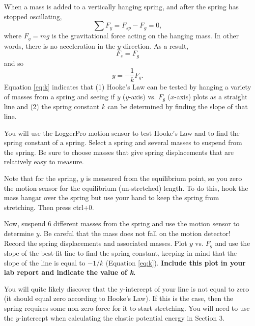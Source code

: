 \documentclass[11pt,letterpaper]{article}
\begin{document}
When a mass is added to a vertically hanging spring, and after the spring has stopped oscillating, 
\begin{equation}
\sum{F_y}=F_{sp}-F_g=0,
\label{eq:F_y}
\end{equation}
where $F_g=mg$ is the gravitational force acting on the hanging mass. In other words, there is no acceleration in the $y$-direction. As a result, 
\begin{equation}
F_s=F_g
\end{equation}
and so
\begin{equation}
y=-\frac{1}{k}F_g.
\label{eq:k}
\end{equation}
Equation \ref{eq:k} indicates that (1) Hooke's Law can be tested by hanging a variety of masses from a spring and seeing if $y$ ($y$-axis) vs. $F_g$ ($x$-axis) plots as a straight line and (2) the spring constant $k$ can be determined by finding the slope of that line. 

You will use the LoggerPro motion sensor to test Hooke's Law and to find the spring constant of a spring. Select a spring and several masses to suspend from the spring. Be sure to choose masses that give spring displacements that are relatively easy to measure.

Note that for the spring, ${y}$ is measured from the equilibrium point, so you zero the motion sensor for the equilibrium (un-stretched) length. To do this, hook the mass hangar over the spring but use your hand to keep the spring from stretching. Then press ctrl+0.

Now, suspend 6 different masses from the spring and use the motion sensor to determine ${y}$. Be careful that the mass does not fall on the motion detector! Record the spring displacements and associated masses. Plot ${y}$ vs. $F_g$ and use the slope of the best-fit line to find the spring constant, keeping in mind that the slope of the line is equal to $-1/k$ (Equation \ref{eq:k}). \textbf{Include this plot in your lab report and indicate the value of \textit{k}.}



You will quite likely discover that the y-intercept of your line is not equal to zero (it should equal zero according to Hooke's Law). If this is the case, then the spring requires some non-zero force for it to start stretching. You will need to use the $y$-intercept when calculating the elastic potential energy in Section 3.
\end{document}
